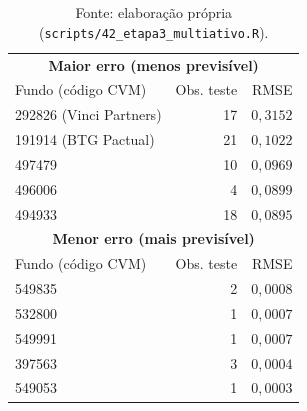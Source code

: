 \documentclass[11pt,a4paper]{article}
\begin{document}
\begin{table}[h]\centering\small
\caption{Os 5 fundos com maior e menor RMSE fora da amostra em VALE3, $h=3$ meses (1.812 fundos
com VALE3 no período de teste).}
\begin{tabular}{@{}lrr@{}}
\toprule
\multicolumn{3}{c}{\textbf{Maior erro (menos previsível)}} \\
Fundo (código CVM) & Obs. teste & RMSE \\
\midrule
292826 (Vinci Partners) & 17 & $0{,}3152$ \\
191914 (BTG Pactual) & 21 & $0{,}1022$ \\
497479 & 10 & $0{,}0969$ \\
496006 & 4 & $0{,}0899$ \\
494933 & 18 & $0{,}0895$ \\
\midrule
\multicolumn{3}{c}{\textbf{Menor erro (mais previsível)}} \\
Fundo (código CVM) & Obs. teste & RMSE \\
\midrule
549835 & 2 & $0{,}0008$ \\
532800 & 1 & $0{,}0007$ \\
549991 & 1 & $0{,}0007$ \\
397563 & 3 & $0{,}0004$ \\
549053 & 1 & $0{,}0003$ \\
\bottomrule
\end{tabular}
\caption*{\footnotesize Fonte: elaboração própria (\texttt{scripts/42\_etapa3\_multiativo.R}).}
\end{table}
\end{document}
